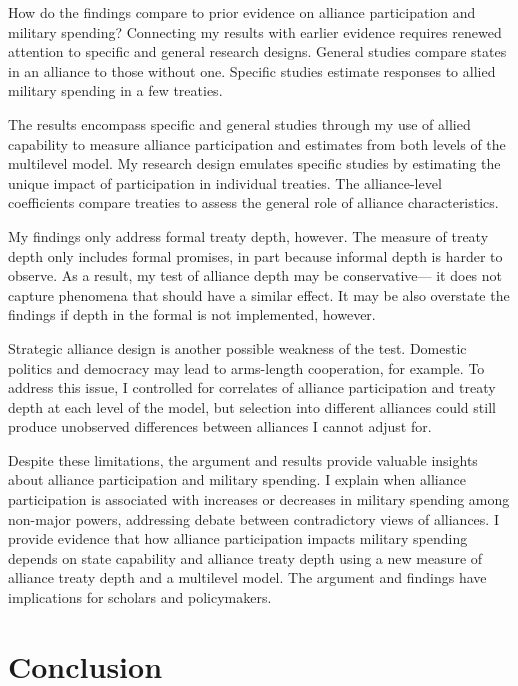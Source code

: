 \documentclass[12pt]{article}
\begin{document}
How do the findings compare to prior evidence on alliance participation and military spending? 
Connecting my results with earlier evidence requires renewed attention to specific and general research designs. 
General studies compare states in an alliance to those without one. 
Specific studies estimate responses to allied military spending in a few treaties. 


The results encompass specific and general studies through my use of allied capability to measure alliance participation and estimates from both levels of the multilevel model. 
My research design emulates specific studies by estimating the unique impact of participation in individual treaties. 
The alliance-level coefficients compare treaties to assess the general role of alliance characteristics.   


My findings only address formal treaty depth, however. 
The measure of treaty depth only includes formal promises, in part because informal depth is harder to observe. 
As a result, my test of alliance depth may be conservative--- it does not capture phenomena that should have a similar effect. 
It may be also overstate the findings if depth in the formal is not implemented, however. 


Strategic alliance design is another possible weakness of the test. 
Domestic politics \citep{Davis2004} and democracy \citep{Chibaetal2015} may lead to arms-length cooperation, for example.   
To address this issue, I controlled for correlates of alliance participation and treaty depth at each level of the model, but selection into different alliances could still produce unobserved differences between alliances I cannot adjust for. 


Despite these limitations, the argument and results provide valuable insights about alliance participation and military spending. 
I explain when alliance participation is associated with increases or decreases in military spending among non-major powers, addressing debate between contradictory views of alliances.  
I provide evidence that how alliance participation impacts military spending depends on state capability and alliance treaty depth using a new measure of alliance treaty depth and a multilevel model. 
The argument and findings have implications for scholars and policymakers. 


\section{Conclusion}
\end{document}
